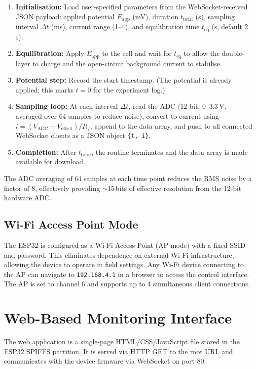 \begin{enumerate}
    \item \textbf{Initialisation:} Load user-specified parameters from the WebSocket-received JSON payload: applied potential $E_\text{app}$ (mV), duration $t_\text{total}$ (s), sampling interval $\Delta t$ (ms), current range (1--4), and equilibration time $t_\text{eq}$ (s, default 2\,s).
    \item \textbf{Equilibration:} Apply $E_\text{app}$ to the cell and wait for $t_\text{eq}$ to allow the double-layer to charge and the open-circuit background current to stabilise.
    \item \textbf{Potential step:} Record the start timestamp. (The potential is already applied; this marks $t = 0$ for the experiment log.)
    \item \textbf{Sampling loop:} At each interval $\Delta t$, read the ADC (12-bit, 0--3.3\,V, averaged over 64 samples to reduce noise), convert to current using $i = (V_\text{ADC} - V_\text{offset}) / R_f$, append to the data array, and push to all connected WebSocket clients as a JSON object \texttt{\{t, i\}}.
    \item \textbf{Completion:} After $t_\text{total}$, the routine terminates and the data array is made available for download.
\end{enumerate}

\noindent The ADC averaging of 64 samples at each time point reduces the RMS noise by a factor of 8, effectively providing $\sim$15\,bits of effective resolution from the 12-bit hardware ADC.

\subsection{Wi-Fi Access Point Mode}

The ESP32 is configured as a Wi-Fi Access Point (AP mode) with a fixed SSID and password. This eliminates dependence on external Wi-Fi infrastructure, allowing the device to operate in field settings. Any Wi-Fi device connecting to the AP can navigate to \texttt{192.168.4.1} in a browser to access the control interface. The AP is set to channel 6 and supports up to 4 simultaneous client connections.

\section{Web-Based Monitoring Interface}
\label{sec:webui}

The web application is a single-page HTML/CSS/JavaScript file stored in the ESP32 SPIFFS partition. It is served via HTTP GET to the root URL and communicates with the device firmware via WebSocket on port 80.

